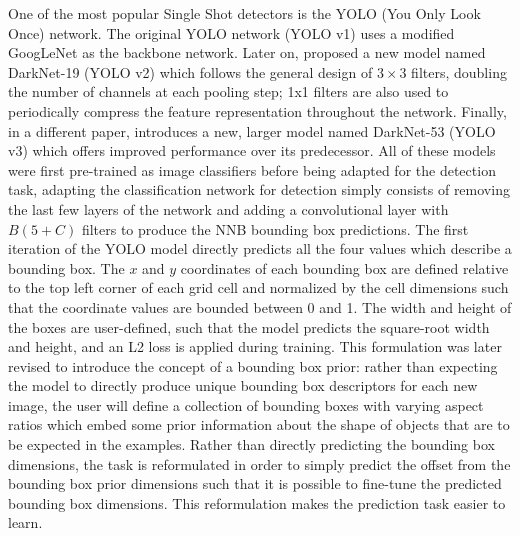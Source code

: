 One of the most popular Single Shot detectors is the YOLO (You Only Look Once) network. The original YOLO network (YOLO v1) \cite{Redmon2015-cy} uses a modified GoogLeNet as the backbone network. Later on, \citeauthor{Redmon2016-ad}\cite{Redmon2016-ad} proposed a new model named DarkNet-19 (YOLO v2) which follows the general design of $3\times3$ filters, doubling the number of channels at each pooling step; 1x1 filters are also used to periodically compress the feature representation throughout the network. Finally, in a different paper, \citeauthor{Redmon_undated-wa}\cite{Redmon_undated-wa} introduces a new, larger model named DarkNet-53 (YOLO v3) which offers improved performance over its predecessor. All of these models were first pre-trained as image classifiers before being adapted for the detection task, adapting the classification network for detection simply consists of removing the last few layers of the network and adding a convolutional layer with $B(5+C)$ filters to produce the NNB bounding box predictions. The first iteration of the YOLO model directly predicts all the four values which describe a bounding box. The $x$ and $y$ coordinates of each bounding box are defined relative to the top left corner of each grid cell and normalized by the cell dimensions such that the coordinate values are bounded between 0 and 1. The width and height of the boxes are user-defined, such that the model predicts the square-root width and height, and an L2 loss is applied during training. This formulation was later revised to introduce the concept of a bounding box prior: rather than expecting the model to directly produce unique bounding box descriptors for each new image, the user will define a collection of bounding boxes with varying aspect ratios which embed some prior information about the shape of objects that are to be expected in the examples. Rather than directly predicting the bounding box dimensions, the task is reformulated in order to simply predict the offset from the bounding box prior dimensions such that it is possible to fine-tune the predicted bounding box dimensions. This reformulation makes the prediction task easier to learn.